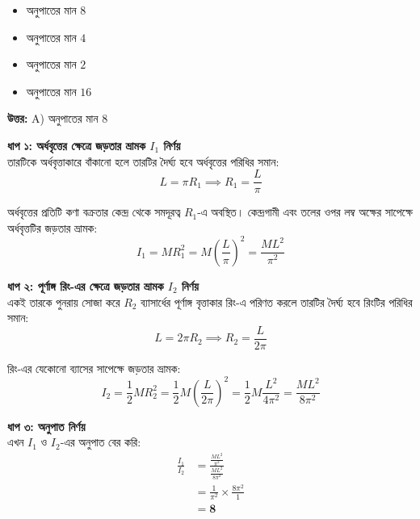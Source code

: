 \documentclass[12pt, a4paper]{article}
\begin{document}
\begin{itemize}[label={}, leftmargin=1cm, itemsep=0.5em]
    \item[\textbf{A)}] অনুপাতের মান $8$
    \item[\textbf{B)}] অনুপাতের মান $4$
    \item[\textbf{C)}] অনুপাতের মান $2$
    \item[\textbf{D)}] অনুপাতের মান $16$
\end{itemize}

\vspace{0.5em}
\begin{tcolorbox}[answerbox]
    \textbf{\color{success} উত্তর:} A) অনুপাতের মান $8$
\end{tcolorbox}
\vspace{1em}

\begin{tcolorbox}[solutionbox={সমাধান (Solution)}]
    \noindent
    \textbf{ধাপ ১: অর্ধবৃত্তের ক্ষেত্রে জড়তার ভ্রামক $I_1$ নির্ণয়} \\
    তারটিকে অর্ধবৃত্তাকারে বাঁকানো হলে তারটির দৈর্ঘ্য হবে অর্ধবৃত্তের পরিধির সমান:
    \[ L = \pi R_1 \implies R_1 = \frac{L}{\pi} \]
    
    অর্ধবৃত্তের প্রতিটি কণা বক্রতার কেন্দ্র থেকে সমদূরত্ব $R_1$-এ অবস্থিত। কেন্দ্রগামী এবং তলের ওপর লম্ব অক্ষের সাপেক্ষে অর্ধবৃত্তটির জড়তার ভ্রামক:
    \[ I_1 = M R_1^2 = M \left(\frac{L}{\pi}\right)^2 = \frac{M L^2}{\pi^2} \]
    
    \vspace{0.5em}
    \noindent\textbf{ধাপ ২: পূর্ণাঙ্গ রিং-এর ক্ষেত্রে জড়তার ভ্রামক $I_2$ নির্ণয়} \\
    একই তারকে পুনরায় সোজা করে $R_2$ ব্যাসার্ধের পূর্ণাঙ্গ বৃত্তাকার রিং-এ পরিণত করলে তারটির দৈর্ঘ্য হবে রিংটির পরিধির সমান:
    \[ L = 2\pi R_2 \implies R_2 = \frac{L}{2\pi} \]
    
    রিং-এর যেকোনো ব্যাসের সাপেক্ষে জড়তার ভ্রামক:
    \[ I_2 = \frac{1}{2} M R_2^2 = \frac{1}{2} M \left(\frac{L}{2\pi}\right)^2 = \frac{1}{2} M \frac{L^2}{4\pi^2} = \frac{M L^2}{8\pi^2} \]
    
    \vspace{0.5em}
    \noindent\textbf{ধাপ ৩: অনুপাত নির্ণয়} \\
    এখন $I_1$ ও $I_2$-এর অনুপাত বের করি:
    \begin{align*}
        \frac{I_1}{I_2} &= \frac{\frac{M L^2}{\pi^2}}{\frac{M L^2}{8\pi^2}} \\
        &= \frac{1}{\pi^2} \times \frac{8\pi^2}{1} \\
        &= \mathbf{8}
    \end{align*}
\end{tcolorbox}
\end{document}
